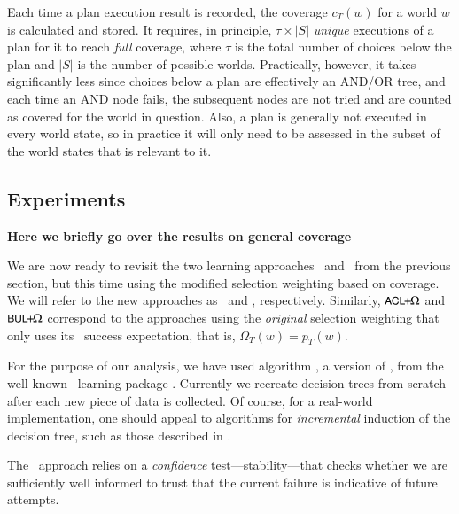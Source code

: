 Each time a plan execution result is recorded, the coverage
$c_T(w)$ for a world $w$ is calculated and stored.
It requires, in principle, $\tau \times |S|$ \emph{unique} executions of
a plan for it to reach \emph{full} coverage, where $\tau$ is the total number of
choices below the plan and $|S|$ is the number of possible worlds. Practically,
however, it takes significantly less since choices below a plan are effectively
an AND/OR tree, and each time an AND node fails, the subsequent
nodes are not tried and are counted as covered for the world in question.
Also, a plan is generally not executed in every world state, so in
practice it will only need to be assessed in the subset of the world
states that is relevant to it.

\subsection{Experiments}

\textbf{Here we briefly go over the results on general coverage}

We are now ready to revisit the two learning approaches \CL\ and \BUL\
from the previous section, but this time using the modified selection weighting
based on coverage.
We will refer to the new approaches as \CLSELB\ and \BULSELB, respectively.
Similarly, $\mbox{$\textsf{\small ACL}\!\!+\!\!\Omega$}$ and $\mbox{$\textsf{\small BUL}\!\!+\!\!\Omega$}$ correspond to the approaches using the
\emph{original} selection weighting that only uses its \dt\ success
expectation, that is, $\Omega_T(w) = p_T(w)$.


For the purpose of our analysis, we have used algorithm
, a version of  \cite{Mitchell97:ML}, from the
well-known \weka\ learning package \cite{weka99}. Currently we
recreate decision trees from scratch after each new piece of data is collected.
Of course, for a real-world implementation, one should appeal to algorithms for
\emph{incremental} induction of the decision tree, such as those described in
\cite{Swere06:Fast,Utgoff97Decision}.

\bigskip\bigskip


The \BUL\ approach relies on a \emph{confidence} test---stability---that checks
whether we are sufficiently well informed to trust that the current failure is
indicative of future attempts.


\bigskip\bigskip


